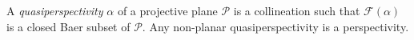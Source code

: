 A \textit{quasiperspectivity} $\alpha$ of a projective plane $\mathcal{P}$ is a collineation such that $\mathcal{F}(\alpha)$ is a closed Baer subset of $\mathcal{P}$. Any non-planar quasiperspectivity is a perspectivity.
